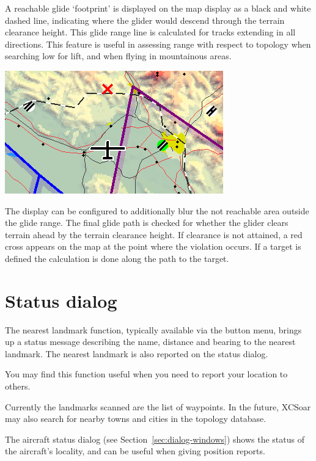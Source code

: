 \documentclass[a4paper,12pt]{refrep}
\begin{document}
A reachable glide `footprint' is displayed on the map display as a black and
white dashed line, indicating where the glider would descend through the
terrain clearance height.  This glide range line is calculated for
tracks extending in all directions.  This feature is useful in
assessing range with respect to topology when searching low for lift,
and when flying in mountainous areas.

\begin{center}
\includegraphics[angle=0,width=0.7\linewidth,keepaspectratio='true']{figures/cut-footprint.png}
\end{center}

The display can be configured to additionally blur the not reachable area
outside the glide range. 
The final glide path is checked for whether the glider clears terrain ahead
by the terrain clearance height.  If clearance is not attained, a red
cross appears on the map at the point where the violation occurs. If a target is
defined the calculation is done along the path to the target. 


\section{Status dialog}\label{sec:aircr-stat-dial}

The nearest landmark function, typically available via the button
menu, brings up a status message describing the name, distance and
bearing to the nearest landmark.  The nearest landmark is also
reported on the status dialog.

You may find this function useful when you need to report your
location to others.

Currently the landmarks scanned are the list of waypoints.  In the
future, XCSoar may also search for nearby towns and cities in the
topology database.

The aircraft status dialog (see Section~\ref{sec:dialog-windows})
shows the status of the aircraft's locality, and can be useful when
giving position reports.
\end{document}
